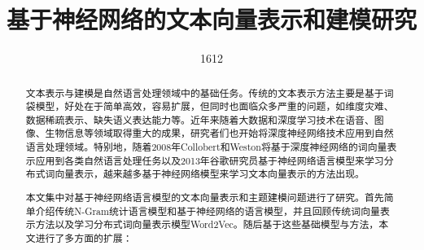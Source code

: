 \documentclass[master]{njuthesis}
\title{基于神经网络的文本向量表示和建模研究 }
\author{1612}
\institute{南京大学}
\begin{document}

\maketitle
\makeenglishtitle


\frontmatter

\begin{abstract}

文本表示与建模是自然语言处理领域中的基础任务。传统的文本表示方法主要是基于词袋模型，好处在于简单高效，容易扩展，但同时也面临众多严重的问题，如维度灾难、数据稀疏表示、缺失语义表达能力等。近年来随着大数据和深度学习技术在语音、图像、生物信息等领域取得重大的成果，研究者们也开始将深度神经网络技术应用到自然语言处理领域。特别地，随着2008年Collobert和Weston将基于深度神经网络的词向量表示应用到各类自然语言处理任务以及2013年谷歌研究员基于神经网络语言模型来学习分布式词向量表示，越来越多基于神经网络模型来学习文本向量表示的方法出现。

本文集中对基于神经网络语言模型的文本向量表示和主题建模问题进行了研究。首先简单介绍传统N-Gram统计语言模型和基于神经网络的语言模型，并且回顾传统词向量表示方法以及学习分布式词向量表示模型Word2Vec。随后基于这些基础模型与方法，本文进行了多方面的扩展：


\end{abstract}
\end{document}
